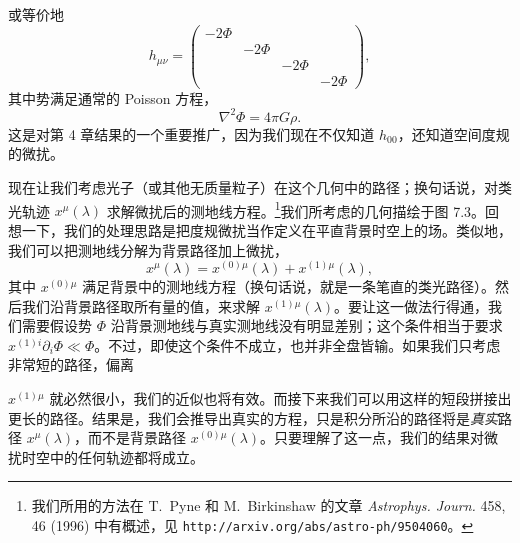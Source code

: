

或等价地
\begin{equation*}
h_{\mu\nu} =
\begin{pmatrix}
-2\Phi & & & \\
& -2\Phi & & \\
& & -2\Phi & \\
& & & -2\Phi
\end{pmatrix},
\tag{7.60}
\end{equation*}
其中势满足通常的 Poisson 方程，
\begin{equation*}
\nabla^2\Phi = 4\pi G\rho.
\tag{7.61}
\end{equation*}
这是对第 4 章结果的一个重要推广，因为我们现在不仅知道 $h_{00}$，还知道空间度规的微扰。

现在让我们考虑光子（或其他无质量粒子）在这个几何中的路径；换句话说，对类光轨迹 $x^\mu(\lambda)$ 求解微扰后的测地线方程。\footnote{我们所用的方法在 T.~Pyne 和 M.~Birkinshaw 的文章 \emph{Astrophys. Journ.} 458, 46 (1996) 中有概述，见 \texttt{http://arxiv.org/abs/astro-ph/9504060}。}我们所考虑的几何描绘于图 7.3。回想一下，我们的处理思路是把度规微扰当作定义在平直背景时空上的场。类似地，我们可以把测地线分解为背景路径加上微扰，
\begin{equation*}
x^\mu(\lambda) = x^{(0)\mu}(\lambda) + x^{(1)\mu}(\lambda),
\tag{7.62}
\end{equation*}
其中 $x^{(0)\mu}$ 满足背景中的测地线方程（换句话说，就是一条笔直的类光路径）。然后我们沿背景路径取所有量的值，来求解 $x^{(1)\mu}(\lambda)$。要让这一做法行得通，我们需要假设势 $\Phi$ 沿背景测地线与真实测地线没有明显差别；这个条件相当于要求 $x^{(1)i}\partial_i\Phi \ll \Phi$。不过，即使这个条件不成立，也并非全盘皆输。如果我们只考虑非常短的路径，偏离


$x^{(1)\mu}$ 就必然很小，我们的近似也将有效。而接下来我们可以用这样的短段拼接出更长的路径。结果是，我们会推导出真实的方程，只是积分所沿的路径将是\emph{真实}路径 $x^\mu(\lambda)$，而不是背景路径 $x^{(0)\mu}(\lambda)$。只要理解了这一点，我们的结果对微扰时空中的任何轨迹都将成立。

